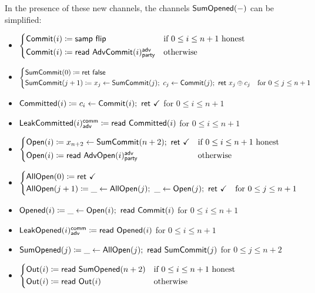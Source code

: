 \noindent In the presence of these new channels, the channels $\mathsf{SumOpened}(-)$ can be simplified:

\begin{itemize}
\item {\color{blue} $\begin{cases*} \Commit(i) \coloneqq \samp{\flip} & \text{if $0 \leq i \leq n+1$ honest} \\ \Commit(i) \coloneqq \read{\AdvCommit(i)^\adv_\party} & \text{otherwise} \end{cases*}$}
\item {\color{blue} $\begin{cases*} \SumCommit(0) \coloneqq \ret{\false} & \\ \SumCommit(j+1) \coloneqq x_j \leftarrow \SumCommit(j); \ c_j \leftarrow \Commit(j); \ \ret{x_j \oplus c_j} & \text{for $0 \leq j \leq n+1$} \end{cases*}$}
\item {\color{magenta} $\mathsf{Committed}(i) \coloneqq c_i \leftarrow \mathsf{Commit}(i); \ \mathsf{ret} \ \checkmark$ for $0 \leq i \leq n+1$}
\item {\color{magenta} $\mathsf{LeakCommitted}(i)^{\mathsf{comm}}_{\mathsf{adv}} \coloneqq \mathsf{read} \ \mathsf{Committed}(i)$ for $0 \leq i \leq n+1$}
\item {\color{teal} $\begin{cases*} \Open(i) \coloneqq x_{n+2} \leftarrow \SumCommit(n+2); \ \ret{\checkmark} & \text{if $0 \leq i \leq n+1$ honest} \\ \Open(i) \coloneqq \read{\AdvOpen(i)^\adv_\party} & \text{otherwise} \end{cases*}$}
\item {\color{teal} $\begin{cases*} \AllOpen(0) \coloneqq \ret{\checkmark} & \\ \AllOpen(j+1) \coloneqq \_ \leftarrow \AllOpen(j); \ \_ \leftarrow \Open(j); \ \ret{\checkmark} & \text{for $0 \leq j \leq n+1$} \end{cases*}$}
\item {\color{red} $\mathsf{Opened}(i) \coloneqq \_ \leftarrow \mathsf{Open}(i); \ \mathsf{read} \ \mathsf{Commit}(i)$ for $0 \leq i \leq n+1$}
\item {\color{red} $\mathsf{LeakOpened}(i)^{\mathsf{comm}}_{\mathsf{adv}} \coloneqq \mathsf{read} \ \mathsf{Opened}(i)$ for $0 \leq i \leq n+1$}
\item {\color{red} $\mathsf{SumOpened}(j) \coloneqq \_ \leftarrow \mathsf{AllOpen}(j); \ \mathsf{read} \ \mathsf{SumCommit}(j)$ for $0 \leq j \leq n+2$}
\item $\begin{cases*} \Out(i) \coloneqq \read{\SumOpened(n+2)} & \text{if $0 \leq i \leq n+1$ honest} \\ \Out(i) \coloneqq \read{\Out(i)} & \text{otherwise} \end{cases*}$
\end{itemize}

